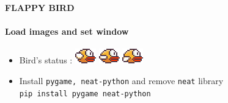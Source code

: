 \documentclass[10pt]{beamer}
\begin{document}
{
%
\begin{frame}[fragile]{\textbf{FLAPPY BIRD}}
    \framesubtitle{\textbf{Load images and set window}}
    \begin{minipage}{0.65\textwidth}
        \begin{itemize}
            \item  Bird's status : \includegraphics[scale=0.7]{bird1.png} \includegraphics[scale=0.7]{bird2.png} \includegraphics[scale=0.7]{bird3.png}
            \item  Install \texttt{pygame, neat-python} and remove \texttt{neat} library\\
            \texttt{pip install pygame neat-python}\\

\end{itemize}
\end{minipage}
\end{frame}}
\end{document}
